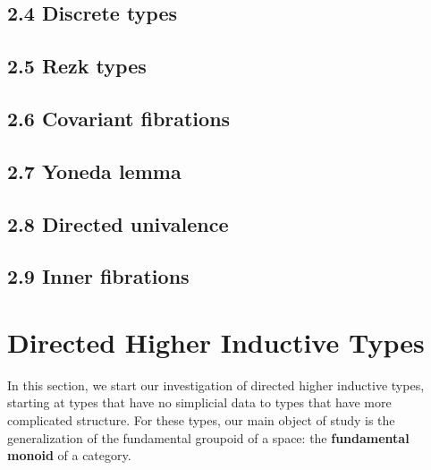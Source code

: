 \documentclass{article}
\theoremstyle{named}
\theoremstyle{remark}
\theoremstyle{definition}
\begin{document}
\subsection*{2.4 Discrete types}

\setcounter{theorem}{0}

\subsection*{2.5 Rezk types}

\setcounter{theorem}{0}

\subsection*{2.6 Covariant fibrations}

\setcounter{theorem}{0}

\subsection*{2.7 Yoneda lemma}

\setcounter{theorem}{0}

\subsection*{2.8 Directed univalence}

\setcounter{theorem}{0}


\subsection*{2.9 Inner fibrations}

\setcounter{theorem}{0}



\section{Directed Higher Inductive Types}
\setcounter{section}{3}
\setcounter{equation}{0}
\setcounter{theorem}{0}
\setcounter{subsection}{1}
In this section, we start our investigation of directed higher inductive types, starting at types that have no simplicial data
to types that have more complicated structure. For these types, our main object of study is the generalization of the fundamental groupoid 
of a space: the \textbf{fundamental monoid} of a category.
\end{document}
